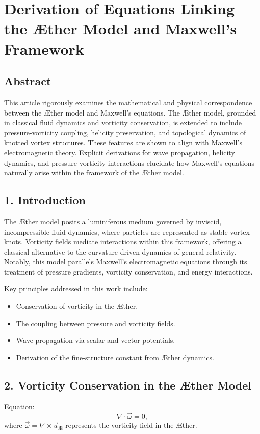 \documentclass[a4paper,10pt]{article}
\begin{document}
    

        \section{Derivation of Equations Linking the Æther Model and Maxwell's Framework}

        \subsection*{Abstract}
        This article rigorously examines the mathematical and physical correspondence between the Æther model and Maxwell's equations. The Æther model, grounded in classical fluid dynamics and vorticity conservation, is extended to include pressure-vorticity coupling, helicity preservation, and topological dynamics of knotted vortex structures. These features are shown to align with Maxwell's electromagnetic theory. Explicit derivations for wave propagation, helicity dynamics, and pressure-vorticity interactions elucidate how Maxwell's equations naturally arise within the framework of the Æther model.

        \subsection*{1. Introduction}
        The Æther model posits a luminiferous medium governed by inviscid, incompressible fluid dynamics, where particles are represented as stable vortex knots. Vorticity fields mediate interactions within this framework, offering a classical alternative to the curvature-driven dynamics of general relativity. Notably, this model parallels Maxwell's electromagnetic equations through its treatment of pressure gradients, vorticity conservation, and energy interactions.

        Key principles addressed in this work include:
        \begin{itemize}
            \item Conservation of vorticity in the Æther.
            \item The coupling between pressure and vorticity fields.
            \item Wave propagation via scalar and vector potentials.
            \item Derivation of the fine-structure constant from Æther dynamics.
        \end{itemize}

        \subsection*{2. Vorticity Conservation in the Æther Model}
        Equation:
        \begin{equation*}
            \nabla \cdot \vec{\omega} = 0,
        \end{equation*}
        where $\vec{\omega} = \nabla \times \vec{u}_\text{Æ}$ represents the vorticity field in the Æther.
\end{document}
